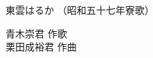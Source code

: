 \documentclass[10pt,b5j]{tarticle} %
\begin{document}
\begin{minipage}[c]{0.7\hsize} %
    \begin{center}
        {\LARGE
            東雲はるか %
        }
        {\small 
            （昭和五十七年寮歌） %
        }
    \end{center}
\end{minipage}
\begin{minipage}[c]{0.3\hsize} %
    \begin{flushright} %
        青木崇君 作歌\\栗田成裕君 作曲 %
    \end{flushright}
\end{minipage}
\end{document}
